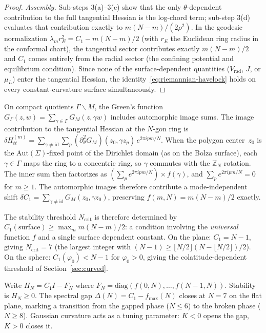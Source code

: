 \begin{proof}
\emph{Assembly.}
Sub-steps 3(a)--3(c) show that the only $\theta$-dependent
contribution to the full tangential Hessian is the log-chord
term; sub-step 3(d) evaluates that contribution exactly to
$m(N{-}m)/(2\rho^2)$.
In the geodesic normalization
$\lambda_m r_E^2 = C_1 - m(N{-}m)/2$
(with $r_E$ the Euclidean ring radius in the conformal chart),
the tangential sector contributes exactly $m(N{-}m)/2$ and
$C_1$ comes entirely from the radial sector (the confining
potential and equilibrium condition).
Since none of the surface-dependent quantities
($V_{\mathrm{rad}}$, $J$, or $\mu_L$) enter the tangential
Hessian, the identity~\eqref{eq:riemannian-havelock} holds
on every constant-curvature surface simultaneously.
\end{proof}

\begin{remark}
On compact quotients $\Gamma\backslash M$, the Green's function
$G_\Gamma(z,w) = \sum_{\gamma \in \Gamma} G_M(z, \gamma w)$
includes automorphic image sums.  The image contribution
to the tangential Hessian at the $N$-gon ring is
$\delta H_{tt}^{(m)} = \sum_{\gamma \ne \mathrm{id}}
\sum_p (\partial^2_\theta G_M)(z_0, \gamma z_p)\,
e^{2\pi ipm/N}$.
When the polygon center~$z_0$ is the $\mathrm{Aut}(\Sigma)$-fixed
point of the Dirichlet domain (as on the Bolza surface),
each $\gamma \in \Gamma$ maps the ring to a concentric ring,
so $\gamma$ commutes with the $\mathbb{Z}_N$ rotation.
The inner sum then factorizes as
$(\sum_p e^{2\pi ipm/N}) \times f(\gamma)$,
and $\sum_p e^{2\pi ipm/N} = 0$ for $m \ge 1$.
The automorphic images therefore contribute a
mode-independent shift $\delta C_1 = \sum_{\gamma \ne \mathrm{id}}
G_M(z_0, \gamma z_0)$, preserving $f(m,N) = m(N{-}m)/2$
exactly.
\end{remark}

The stability threshold $N_{\mathrm{crit}}$ is therefore determined by
$C_1(\text{surface}) \ge \max_m m(N{-}m)/2$: a condition involving the
\emph{universal} function $f$ and a single surface dependent constant.
On the plane: $C_1 = N{-}1$, giving $N_{\mathrm{crit}} = 7$ (the
largest integer with $(N{-}1) \ge \lfloor N/2\rfloor(N{-}\lfloor
N/2\rfloor)/2$).  On the sphere:
$C_1(\varphi_0) < N{-}1$ for $\varphi_0 > 0$, giving the
colatitude-dependent threshold of Section~\ref{sec:curved}.

\begin{remark}
\label{rem:rep-theory}
Write $H_N = C_1 I - F_N$ where $F_N = \mathrm{diag}(f(0,N),
\ldots, f(N{-}1,N))$.  Stability is $H_N \ge 0$.  The spectral gap
$\Delta(N) = C_1 - f_{\max}(N)$ closes at $N = 7$ on the flat
plane, marking a transition from the gapped phase
($N \le 6$) to the broken phase ($N \ge 8$).
Gaussian curvature acts as a tuning parameter:
$K < 0$ opens the gap, $K > 0$ closes it.
\end{remark}

